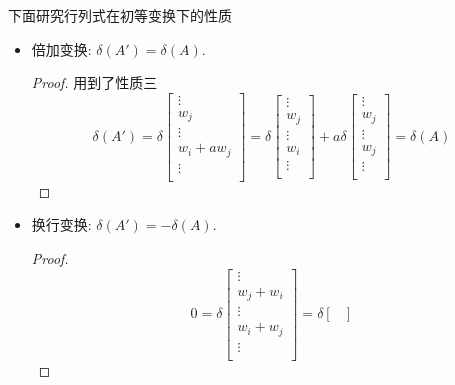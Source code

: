 下面研究行列式在初等变换下的性质
\begin{itemize}
    \item 倍加变换: $\delta (A') = \delta (A)$.
    \begin{proof}
        用到了性质三
        \begin{equation}
          \delta (A') = \delta \begin{bmatrix}
           \vdots\\
           w_j\\
           \vdots\\
           w_i + a w_j\\
           \vdots\\
          \end{bmatrix}
          = 
          \delta \begin{bmatrix}
            \vdots\\
            w_j\\
            \vdots\\
            w_i \\
            \vdots\\
           \end{bmatrix}
          +
          a \delta 
          \begin{bmatrix}
           \vdots\\
           w_j\\
           \vdots\\
           w_j\\
           \vdots\\
          \end{bmatrix}
          =\delta (A)
        \end{equation}
    \end{proof}
    \item 换行变换: $\delta(A') = -\delta (A)$.
    \begin{proof}
        \begin{equation}
            0=
            \delta \begin{bmatrix}
                \vdots\\
                w_j + w_i\\
                \vdots\\
                w_i + w_j\\
                \vdots\\
               \end{bmatrix}
            = \delta
            \begin{bmatrix}

\end{bmatrix}
\end{equation}
\end{proof}
\end{itemize}
